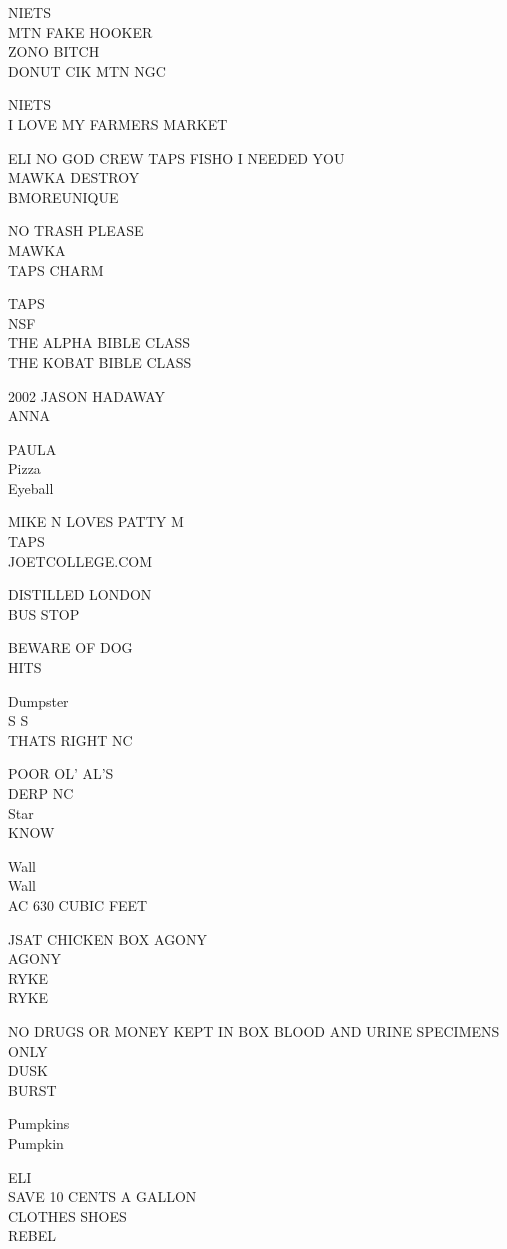\documentclass[10pt,letterpaper]{article}
\begin{document}
NIETS\\
MTN FAKE HOOKER\\
ZONO BITCH\\
DONUT CIK MTN NGC

NIETS\\
I LOVE MY FARMERS MARKET

ELI NO GOD CREW TAPS FISHO I NEEDED YOU\\
MAWKA DESTROY\\
BMOREUNIQUE

NO TRASH PLEASE\\
MAWKA\\
TAPS CHARM

TAPS\\
NSF\\
THE ALPHA BIBLE CLASS\\
THE KOBAT BIBLE CLASS

2002 JASON HADAWAY\\
ANNA

PAULA\\
Pizza\\
Eyeball

MIKE N LOVES PATTY M\\
TAPS\\
JOETCOLLEGE.COM

DISTILLED LONDON\\
BUS STOP

BEWARE OF DOG\\
HITS

Dumpster\\
S S\\
THATS RIGHT NC

POOR OL' AL'S\\
DERP NC\\
Star\\
KNOW

Wall\\
Wall\\
AC 630 CUBIC FEET

JSAT CHICKEN BOX AGONY\\
AGONY\\
RYKE\\
RYKE

NO DRUGS OR MONEY KEPT IN BOX BLOOD AND URINE SPECIMENS ONLY\\
DUSK\\
BURST

Pumpkins\\
Pumpkin

ELI\\
SAVE 10 CENTS A GALLON\\
CLOTHES SHOES\\
REBEL
\end{document}
